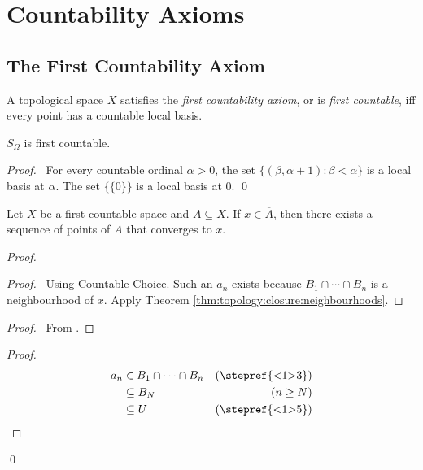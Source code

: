\chapter{Countability Axioms}

\section{The First Countability Axiom}

\begin{df}
  A topological space $X$ satisfies the \emph{first countability axiom}, or
  is \emph{first countable}, iff every point has a countable local basis.
\end{df}

 \begin{prop}
$S_\Omega$ is first countable.
\end{prop}

\begin{proof}
 \pf\ For every countable ordinal $\alpha > 0$, the set $\{ (\beta, \alpha +
 1) :    \beta < \alpha \}$ is a local basis at $\alpha$. The set $\{ \{ 0
 \} \}$ is a local basis at 0. \qed
\end{proof}

\begin{thm}
  \label{sequence_lemma}
  Let $X$ be a first countable space and $A \subseteq X$. If $x \in
  \overline{A}$, then there exists a sequence of points of $A$ that converges
  to $x$.
\end{thm}

\begin{proof}
  \pf
  \begin{proof}
    \pf\ Using Countable Choice. Such an $a_n$ exists because $B_1 \cap
    \cdots
    \cap B_n$ is a neighbourhood of $x$. Apply Theorem
    \ref{thm:topology:closure:neighbourhoods}.
  \end{proof}
  \begin{proof}
    \pf\ From .
  \end{proof}
  \begin{proof}
    \pf
    \begin{align*}
      a_n & \in B_1 \cap \cdots \cap B_n & (\text{\stepref{<1>3}}) \\
      & \subseteq B_N & (n \geq N) \\
      & \subseteq U & (\text{\stepref{<1>5}})
    \end{align*}
  \end{proof}
  \qed
\end{proof}

